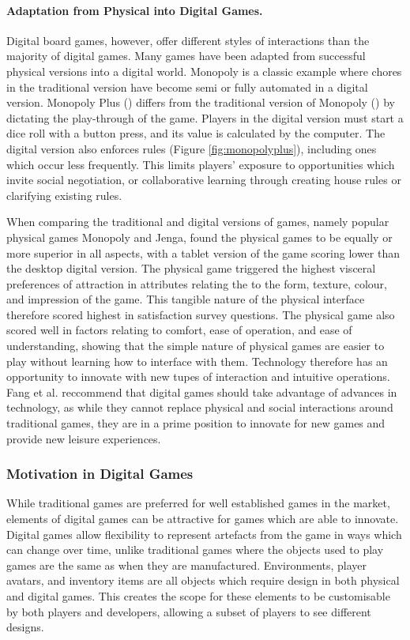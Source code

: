 \documentclass[12pt]{article}
\begin{document}
\paragraph{Adaptation from Physical into Digital Games.} Digital board games, however, offer different styles of interactions than the majority of digital games. 
Many games have been adapted from successful physical versions into a digital world. 
Monopoly is a classic example where chores in the traditional version have become semi or fully automated in a digital version. 
Monopoly Plus (\cite{monopolyplus2017}) differs from the traditional version of Monopoly (\cite{monopoly}) by dictating the play-through of the game. 
Players in the digital version must start a dice roll with a button press, and its value is calculated by the computer. 
The digital version also enforces rules (Figure \ref{fig:monopolyplus}), including ones which occur less frequently.
This limits players' exposure to opportunities which invite social negotiation, or collaborative learning through creating house rules or clarifying existing rules.

When comparing the traditional and digital versions of games, namely popular physical games Monopoly and Jenga, \textcite{fang2016emotional} found the physical games to be equally or more superior in all aspects, with a tablet version of the game scoring lower than the desktop digital version. 
The physical game triggered the highest visceral preferences of attraction in attributes relating the to the form, texture, colour, and impression of the game. 
This tangible nature of the physical interface therefore scored highest in satisfaction survey questions. 
The physical game also scored well in factors relating to comfort, ease of operation, and ease of understanding, showing that the simple nature of physical games are easier to play without learning how to interface with them. Technology therefore has an opportunity to innovate with new tupes of interaction and intuitive operations. 
Fang et al. reccommend that digital games should take advantage of advances in technology, as while they cannot replace physical and social interactions around traditional games, they are in a prime position to innovate for new games and provide new leisure experiences. 

\subsubsection{Motivation in Digital Games}
While traditional games are preferred for well established games in the market, elements of digital games can be attractive for games which are able to innovate. 
Digital games allow flexibility to represent artefacts from the game in ways which can change over time, unlike traditional games where the objects used to play games are the same as when they are manufactured. 
Environments, player avatars, and inventory items are all objects which require design in both physical and digital games.
This creates the scope for these elements to be customisable by both players and developers, allowing a subset of players to see different designs. 
\end{document}
